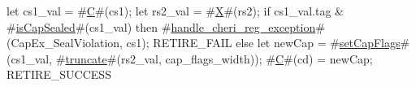 let cs1_val = #\hyperref[sailRISCVzC]{C}#(cs1);
let rs2_val = #\hyperref[sailRISCVzX]{X}#(rs2);
if cs1_val.tag & #\hyperref[sailRISCVzisCapSealed]{isCapSealed}#(cs1_val) then {
  #\hyperref[sailRISCVzhandlezycherizyregzyexception]{handle\_cheri\_reg\_exception}#(CapEx_SealViolation, cs1);
  RETIRE_FAIL
} else {
  let newCap = #\hyperref[sailRISCVzsetCapFlags]{setCapFlags}#(cs1_val, #\hyperref[sailRISCVztruncate]{truncate}#(rs2_val, cap_flags_width));
  #\hyperref[sailRISCVzC]{C}#(cd) = newCap;
  RETIRE_SUCCESS
}
